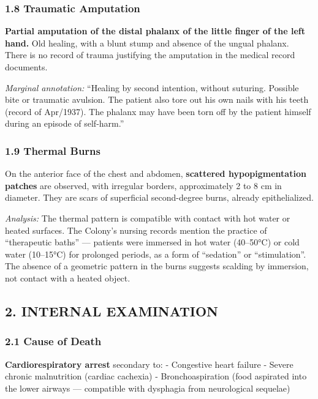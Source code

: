 \subsubsection*{1.8 Traumatic Amputation}

\noindent \textbf{Partial amputation of the distal phalanx of the little finger of the left hand.} Old healing, with a blunt stump and absence of the ungual phalanx. There is no record of trauma justifying the amputation in the medical record documents.

\noindent \textit{Marginal annotation:} ``Healing by second intention, without suturing. Possible bite or traumatic avulsion. The patient also tore out his own nails with his teeth (record of Apr/1937). The phalanx may have been torn off by the patient himself during an episode of self-harm.''

\subsubsection*{1.9 Thermal Burns}

\noindent On the anterior face of the chest and abdomen, \textbf{scattered hypopigmentation patches} are observed, with irregular borders, approximately 2 to 8 cm in diameter. They are scars of superficial second-degree burns, already epithelialized.

\noindent \textit{Analysis:} The thermal pattern is compatible with contact with hot water or heated surfaces. The Colony's nursing records mention the practice of ``therapeutic baths'' --- patients were immersed in hot water (40--50°C) or cold water (10--15°C) for prolonged periods, as a form of ``sedation'' or ``stimulation''. The absence of a geometric pattern in the burns suggests scalding by immersion, not contact with a heated object.

\subsection*{2. INTERNAL EXAMINATION}

\subsubsection*{2.1 Cause of Death}

\noindent \textbf{Cardiorespiratory arrest} secondary to:
- Congestive heart failure
- Severe chronic malnutrition (cardiac cachexia)
- Bronchoaspiration (food aspirated into the lower airways --- compatible with dysphagia from neurological sequelae)

